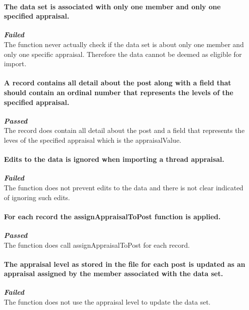 \paragraph{\color{black} The data set is associated with only one member and only one specified appraisal.\\}
\color{red}
\textbf{\small \emph{Failed}} \\
\color{black} The function never actually check if the data set is about only one member and only one specific appraisal. Therefore the data cannot be deemed as eligible for import.
\par



\paragraph{\color{black}A record contains all detail about the post along with a field that should contain an ordinal number that represents the levels of the specified appraisal.\\}
\color{green}
\textbf{\small \emph{Passed}} \\
\color{black}The record does contain all detail about the post and a field that represents the leves of the specified appraisal which is the appraisalValue.
\par

\paragraph{\color{black} Edits to the data is ignored when importing a thread appraisal.\\}
\color{red}
\textbf{\small \emph{Failed}} \\
\color{black} The function does not prevent edits to the data and there is not clear indicated of ignoring such edits.
\par

\paragraph{\color{black}For each record the assignAppraisalToPost function is applied.\\}
\color{green}
\textbf{\small \small \emph{Passed}} \\
\color{black}The function does call assignAppraisalToPost for each record.
\par

\paragraph{\color{black}The appraisal level as stored in the file for each post is updated as an appraisal assigned by the member associated with the data set.\\}
\color{red}
\textbf{\small \emph{Failed}} \\
\color{black}The function does not use the appraisal level to update the data set.
\par


